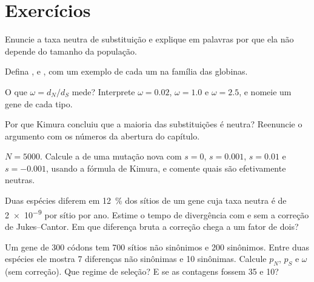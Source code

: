 \section{Exercícios}

\begin{exercise}[$\star$]\label{exo:b3:molecular-evolution:1}
Enuncie a taxa neutra de substituição e explique em palavras por que ela
não depende do tamanho da população.
\end{exercise}

\begin{exercise}[$\star$]\label{exo:b3:molecular-evolution:2}
Defina ,  e , com um exemplo de cada um na
família das globinas.
\end{exercise}

\begin{exercise}[$\star$]\label{exo:b3:molecular-evolution:3}
O que $\omega = d_{N}/d_{S}$ mede? Interprete $\omega = 0.02$, $\omega = 1.0$ e $\omega = 2.5$, e nomeie um gene de cada tipo.
\end{exercise}

\begin{exercise}[$\star$]\label{exo:b3:molecular-evolution:4}
Por que Kimura concluiu que a maioria das substituições é neutra?
Reenuncie o argumento com os números da abertura do capítulo.
\end{exercise}

\begin{exercise}[$\star\star$]\label{exo:b3:molecular-evolution:5}
$N = 5000$. Calcule a  de uma mutação nova com $s
= 0$, $s = 0.001$, $s = 0.01$ e $s = -0.001$, usando a fórmula de Kimura,
e comente quais são efetivamente neutras.
\end{exercise}

\begin{exercise}[$\star\star$]\label{exo:b3:molecular-evolution:6}
Duas espécies diferem em \qty{12}{\%} dos sítios de um gene cuja taxa
neutra é de \qty{2e-9}{} por sítio por ano. Estime o tempo de divergência
com e sem a correção de Jukes--Cantor. Em que diferença bruta a correção
chega a um fator de dois?
\end{exercise}

\begin{exercise}[$\star\star$]\label{exo:b3:molecular-evolution:7}
Um gene de 300 códons tem 700 sítios não sinônimos e 200 sinônimos. Entre
duas espécies ele mostra 7 diferenças não sinônimas e 10 sinônimas.
Calcule $p_{N}$, $p_{S}$ e $\omega$ (sem correção). Que regime de
seleção? E se as contagens fossem 35 e 10?
\end{exercise}

